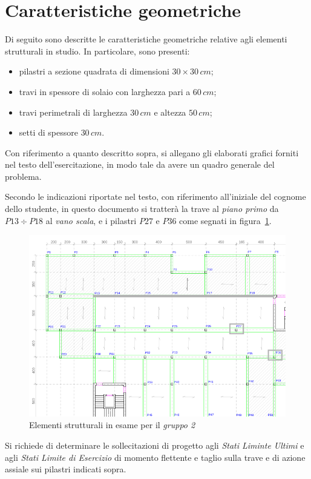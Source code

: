\section{Caratteristiche geometriche}\label{sec:geomCar}
Di seguito sono descritte le caratteristiche geometriche relative agli elementi strutturali in studio. In particolare, sono presenti:
\begin{itemize}
 \item pilastri a sezione quadrata di dimensioni $30 \times 30\,\si{cm}$;
 \item travi in spessore di solaio con larghezza pari a $60\,\si{cm}$;
 \item travi perimetrali di larghezza $30\,\si{cm}$ e altezza $50\,\si{cm}$;
 \item setti di spessore $30\,\si{cm}$.
\end{itemize}

Con riferimento a quanto descritto sopra, si allegano gli elaborati grafici forniti nel testo dell'esercitazione, in modo tale da avere un quadro generale del problema.
\cleardoublepage





\cleardoublepage
Secondo le indicazioni riportate nel testo, con riferimento all'iniziale del cognome dello studente, in questo documento si tratterà la trave al \emph{piano primo} da $P13 \div P18$ al \emph{vano scala}, e i pilastri $P27$ e $P36$ come segnati in figura~\ref{fig:pianoPrimo}.
\begin{figure}
 \centering
 \includegraphics[width=\textwidth]{img/pianoPrimo_esercitazione.png}
 \caption{Elementi strutturali in esame per il \emph{gruppo 2}}
 \label{fig:pianoPrimo}
\end{figure}

Si richiede di determinare le sollecitazioni di progetto agli \emph{Stati Liminte Ultimi} e agli \emph{Stati Limite di Esercizio} di momento flettente e taglio sulla trave e di azione assiale sui pilastri indicati sopra. 
\cleardoublepage

